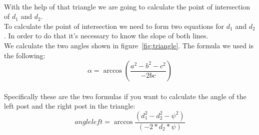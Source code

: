 \documentclass[lnicst,a4paper]{svmultln}
\begin{document}
\\
With the help of that triangle we are going to calculate the point of intersection of \(d_{1}\) and \(d_{2}\). 
\\ 
To calculate the point of intersection we need to form two equations for \(d_{1}\) and \(d_{2}\). In order to do that it's necessary to know the slope of both lines. 
\\
We calculate the two angles shown in figure~\ref{fig:triangle}.
The formula we used is the following:
\begin{equation}
	\alpha = \arccos{(\frac{a^2-b^2-c^2}{-2bc})}
	\label{equ:angle1}
\end{equation}
\\
Specifically these are the two formulas if you want to calculate the angle of the left post and the right post in the triangle:
\\
\begin{equation}
	angleleft = \arccos{\frac{(d_{1}^2 - d_{2}^2 - \psi^2)}{(-2*d_{2}*\psi)}}
	\label{equ:angleleft}
\end{equation}
\end{document}
